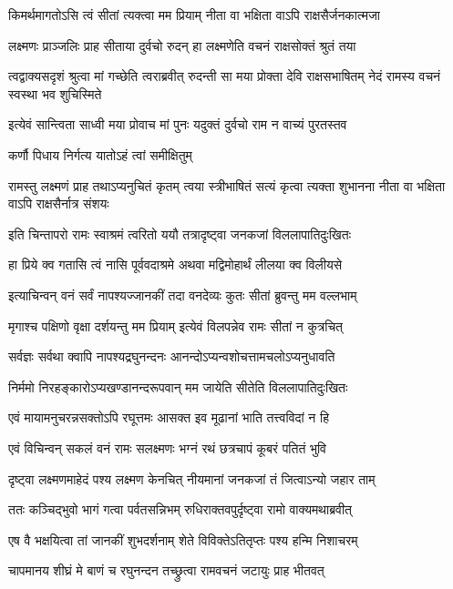 \twolineshloka
{किमर्थमागतोऽसि त्वं सीतां त्यक्त्वा मम प्रियाम्}
{नीता वा भक्षिता वाऽपि राक्षसैर्जनकात्मजा} %

\twolineshloka
{लक्ष्मणः प्राञ्जलिः प्राह सीताया दुर्वचो रुदन्}
{हा लक्ष्मणेति वचनं राक्षसोक्तं श्रुतं तया} %

\threelineshloka
{त्वद्वाक्यसदृशं श्रुत्वा मां गच्छेति त्वराब्रवीत्}
{रुदन्ती सा मया प्रोक्ता देवि राक्षसभाषितम्}
{नेदं रामस्य वचनं स्वस्था भव शुचिस्मिते} %

\twolineshloka
{इत्येवं सान्त्विता साध्वी मया प्रोवाच मां पुनः}
{यदुक्तं दुर्वचो राम न वाच्यं पुरतस्तव} %

\onelineshloka
{कर्णौ पिधाय निर्गत्य यातोऽहं त्वां समीक्षितुम्} %


\threelineshloka
{रामस्तु लक्ष्मणं प्राह तथाऽप्यनुचितं कृतम्}
{त्वया स्त्रीभाषितं सत्यं कृत्वा त्यक्ता शुभानना}
{नीता वा भक्षिता वाऽपि राक्षसैर्नात्र संशयः} %

\twolineshloka
{इति चिन्तापरो रामः स्वाश्रमं त्वरितो ययौ}
{तत्रादृष्ट्वा जनकजां विललापातिदुःखितः} %

\twolineshloka
{हा प्रिये क्व गतासि त्वं नासि पूर्ववदाश्रमे}
{अथवा मद्विमोहार्थं लीलया क्व विलीयसे} %

\twolineshloka
{इत्याचिन्वन् वनं सर्वं नापश्यज्जानकीं तदा}
{वनदेव्यः कुतः सीतां ब्रुवन्तु मम वल्लभाम्} %

\twolineshloka
{मृगाश्च पक्षिणो वृक्षा दर्शयन्तु मम प्रियाम्}
{इत्येवं विलपन्नेव रामः सीतां न कुत्रचित्} %

\twolineshloka
{सर्वज्ञः सर्वथा क्वापि नापश्यद्रघुनन्दनः}
{आनन्दोऽप्यन्वशोचत्तामचलोऽप्यनुधावति} %

\twolineshloka
{निर्ममो निरहङ्कारोऽप्यखण्डानन्दरूपवान्}
{मम जायेति सीतेति विललापातिदुःखितः} %

\twolineshloka
{एवं मायामनुचरन्नसक्तोऽपि रघूत्तमः}
{आसक्त इव मूढानां भाति तत्त्वविदां न हि} %

\twolineshloka
{एवं विचिन्वन् सकलं वनं रामः सलक्ष्मणः}
{भग्नं रथं छत्रचापं कूबरं पतितं भुवि} %

\twolineshloka
{दृष्ट्वा लक्ष्मणमाहेदं पश्य लक्ष्मण केनचित्}
{नीयमानां जनकजां तं जित्वाऽन्यो जहार ताम्} %

\twolineshloka
{ततः कञ्चिद्भुवो भागं गत्वा पर्वतसन्निभम्}
{रुधिराक्तवपुर्दृष्ट्वा रामो वाक्यमथाब्रवीत्} %

\twolineshloka
{एष वै भक्षयित्वा तां जानकीं शुभदर्शनाम्}
{शेते विविक्तेऽतितृप्तः पश्य हन्मि निशाचरम्} %

\twolineshloka
{चापमानय शीघ्रं मे बाणं च रघुनन्दन}
{तच्छ्रुत्वा रामवचनं जटायुः प्राह भीतवत्} %

